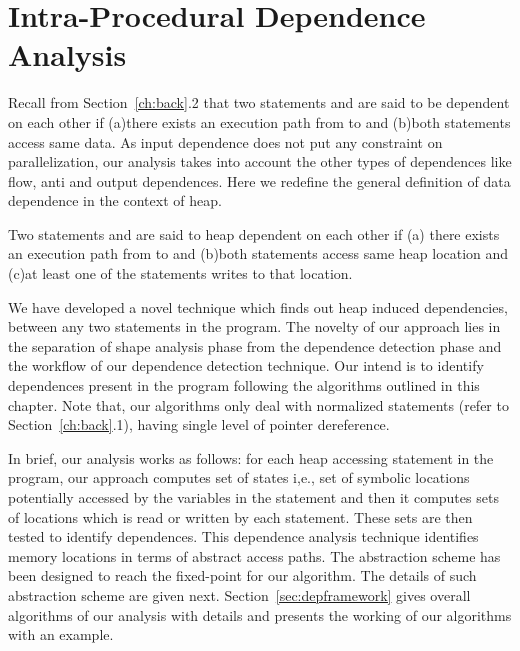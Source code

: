\chapter{Intra-Procedural Dependence Analysis}
\label{ch:dep}
Recall from Section~\ref{ch:back}.2 that two statements  and  are said to be 
dependent on each other if (a)there exists an execution path from 
 to  and (b)both statements access 
same data. As input dependence does not put any constraint on parallelization, 
our analysis takes into account the other types of dependences like flow, anti and output dependences. 
Here we redefine the general definition of data dependence in the context of heap. 
\begin{mydef}{
Two statements  and  are said to heap dependent on each 
other if (a) there exists an execution path from 
 to  and (b)both statements access 
same heap location and (c)at least one of the statements writes 
to that location.
}
\end{mydef}
We have developed a novel technique which finds out heap induced
dependencies, between any two statements in the program. The
novelty of our approach lies in the separation of shape
analysis phase from the dependence detection phase and the workflow of 
our dependence detection technique.
Our intend is to identify dependences present in the program 
following the algorithms outlined in this chapter.
Note that, our algorithms only deal with normalized statements (refer to Section~\ref{ch:back}.1), having single 
level of pointer dereference.  

In brief, our analysis works as follows: for each heap accessing statement 
in the program, our approach computes set of states i,e., set of symbolic 
locations potentially accessed by the variables in the statement and then it 
computes sets of locations which is read or written by each statement. These 
sets are then tested to identify dependences. This dependence analysis technique 
identifies memory locations in terms of abstract access paths. The abstraction 
scheme has been designed to reach the fixed-point for our algorithm. The 
details of such abstraction scheme are given next. Section~\ref{sec:depframework} gives 
overall algorithms of our analysis with details and presents the working of our algorithms with an example. 
%
